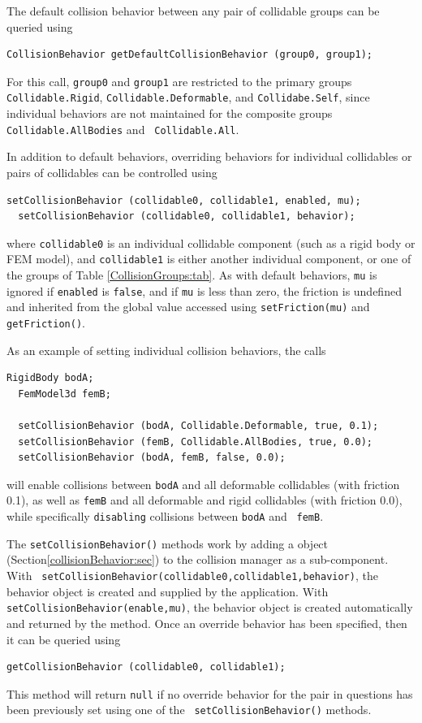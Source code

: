 The default collision behavior between any pair of collidable groups can
be queried using
%
\begin{lstlisting}[]
  CollisionBehavior getDefaultCollisionBehavior (group0, group1);
\end{lstlisting}
%
For this call, {\tt group0} and {\tt group1} are restricted to the
primary groups {\tt Collidable.Rigid}, {\tt Collidable.Deformable},
and {\tt Collidabe.Self}, since individual behaviors are not
maintained for the composite groups {\tt Collidable.AllBodies} and {\tt
Collidable.All}.

In addition to default behaviors, overriding behaviors for individual
collidables or pairs of collidables can be controlled using
%
\begin{lstlisting}[]
  setCollisionBehavior (collidable0, collidable1, enabled, mu);
  setCollisionBehavior (collidable0, collidable1, behavior);
\end{lstlisting}
%
where {\tt collidable0} is an individual collidable component (such as
a rigid body or FEM model), and {\tt collidable1} is either another
individual component, or one of the groups of Table
\ref{CollisionGroups:tab}.  As with default behaviors, {\tt mu}
is ignored if {\tt enabled} is {\tt false}, and if {\tt mu} is less
than zero, the friction is undefined and inherited from the global
value accessed using {\tt setFriction(mu)} and {\tt getFriction()}.

As an example of setting individual collision behaviors, the calls
\begin{lstlisting}[]
  RigidBody bodA; 
  FemModel3d femB;

  setCollisionBehavior (bodA, Collidable.Deformable, true, 0.1);
  setCollisionBehavior (femB, Collidable.AllBodies, true, 0.0);
  setCollisionBehavior (bodA, femB, false, 0.0);
\end{lstlisting}
will enable collisions between {\tt bodA} and all deformable
collidables (with friction 0.1), as well as {\tt femB} and all
deformable and rigid collidables (with friction 0.0), while
specifically {\tt disabling} collisions between {\tt bodA} and {\tt
femB}.

The {\tt setCollisionBehavior()} methods work by adding a
 object 
(Section\ref{collisionBehavior:sec}) 
to the
collision manager as a sub-component. With {\tt
setCollisionBehavior(collidable0,collidable1,behavior)}, the behavior
object is created and supplied by the application.  With {\tt
setCollisionBehavior(enable,mu)}, the behavior object is created
automatically and returned by the method. Once an override behavior
has been specified, then it can be queried using
%
\begin{lstlisting}[]
  getCollisionBehavior (collidable0, collidable1);
\end{lstlisting}
%
This method will return {\tt null} if no override behavior for the
pair in questions has been previously set using one of the {\tt
setCollisionBehavior()} methods.

